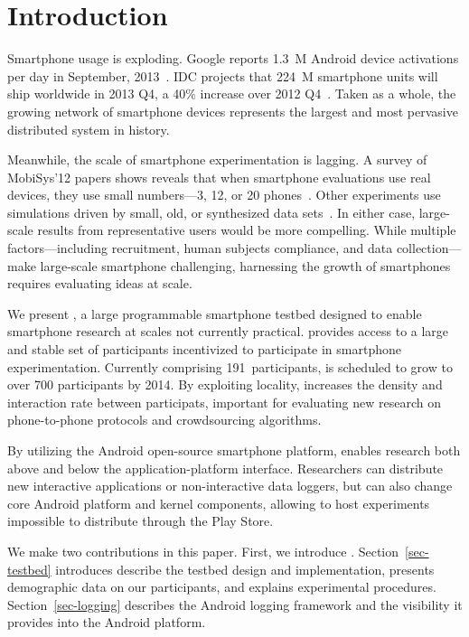 \section{Introduction}
\label{sec-introduction}

Smartphone usage is exploding. Google reports 1.3~M Android device activations
per day in September, 2013~\cite{google-Sep2012-activations}. IDC projects that
224~M smartphone units will ship worldwide in 2013 Q4, a 40\% increase over
2012 Q4~\cite{idc-smartphone-growth}. Taken as a whole, the growing network of
smartphone devices represents the largest and most pervasive distributed system
in history.

Meanwhile, the scale of smartphone experimentation is lagging. A survey of
MobiSys'12 papers shows reveals that when smartphone evaluations use real
devices, they use small numbers---3, 12, or 20
phones~\cite{nowar-mobisys12,comon-mobisys12,caching-mobisys12}. Other
experiments use simulations driven by small, old, or synthesized data
sets~\cite{falcon-mobisys12,ace-mobisys12,humanmobility-mobisys12}. In either
case, large-scale results from representative users would be more compelling.
While multiple factors---including recruitment, human subjects compliance,
and data collection---make large-scale smartphone challenging, harnessing the
growth of smartphones requires evaluating ideas at scale.

We present \PhoneLab{}, a large programmable smartphone testbed designed to
enable smartphone research at scales not currently practical. \PhoneLab{}
provides access to a large and stable set of participants incentivized to
participate in smartphone experimentation. Currently comprising
191~participants, \PhoneLab{} is scheduled to grow to over 700 participants
by 2014. By exploiting locality, \PhoneLab{} increases the density and
interaction rate between participats, important for evaluating new research
on phone-to-phone protocols and crowdsourcing algorithms.

By utilizing the Android open-source smartphone platform, \PhoneLab{} enables
research both above and below the application-platform interface. Researchers
can distribute new interactive applications or non-interactive data loggers,
but can also change core Android platform and kernel components, allowing
\PhoneLab{} to host experiments impossible to distribute through the Play
Store.

We make two contributions in this paper. First, we introduce \PhoneLab{}.
Section~\ref{sec-testbed} introduces describe the testbed design and
implementation, presents demographic data on our participants, and explains
experimental procedures. Section~\ref{sec-logging} describes the Android
logging framework and the visibility it provides into the Android platform.

